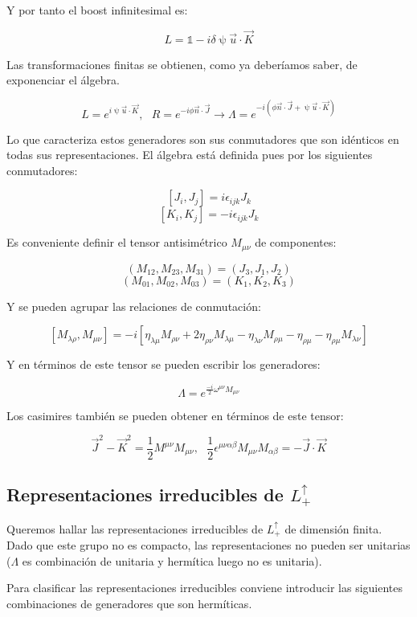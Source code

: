 Y por tanto el boost infinitesimal es:

$$L=\mathds{1}-i\delta \uppsi \Vec{u} \cdot \Vec{K}$$

\newpage

Las transformaciones finitas se obtienen, como ya deberíamos saber, de exponenciar el álgebra.

$$L=e^{i\uppsi \Vec{u} \cdot \Vec{K}}, \ \ \ R=e^{-i \phi \Vec{n} \cdot \Vec{J}} \longrightarrow \Lambda =e^{-i(\phi \Vec{n}\cdot \Vec{J} + \uppsi \Vec{u}\cdot \Vec{K})}$$

Lo que caracteriza estos generadores son sus conmutadores que son idénticos en todas sus representaciones. El álgebra está definida pues por los siguientes conmutadores:


$$[J_i,J_j]=i\epsilon _{ijk}J_k$$
$$[K_i,K_j]=-i\epsilon_{ijk}J_k$$

Es conveniente definir el tensor antisimétrico $M_{\mu \nu}$ de componentes:

$$(M_{12},M_{23},M_{31})=(J_3,J_1,J_2)$$
$$(M_{01},M_{02},M_{03})=(K_1,K_2,K_3)$$

Y se pueden agrupar las relaciones de conmutación:

$$[M_{\lambda \rho},M_{\mu \nu}]=-i[\eta_{\lambda \mu}M_{\rho \nu} + 2\eta _{\rho \nu} M_{\lambda \mu}-\eta _{\lambda \nu}M_{\rho \mu} - \eta_{\rho \mu}-\eta _{\rho \mu}M_{\lambda \nu} ]$$

Y en términos de este tensor se pueden escribir los generadores:

$$\Lambda = e^{\frac{-i}{2}\omega ^{\mu \nu} M_{\mu \nu}}$$

Los casimires también se pueden obtener en términos de este tensor:

$$\Vec{J}^2-\Vec{K}^2 = \frac{1}{2}M^{\mu \nu} M_{\mu \nu}, \ \ \ \frac{1}{2}\epsilon ^{\mu \nu \alpha \beta }M_{\mu \nu}M_{\alpha \beta}=-\Vec{J}\cdot \Vec{K}$$


\subsection{Representaciones irreducibles de $L^\uparrow _+$}

Queremos hallar las representaciones irreducibles de $L^\uparrow _+$ de dimensión finita. Dado que este grupo no es compacto, las representaciones no pueden ser unitarias ($\Lambda$ es combinación de unitaria y hermítica luego no es unitaria).

\smallskip
Para clasificar las representaciones irreducibles conviene introducir las siguientes combinaciones de generadores que son hermíticas.

